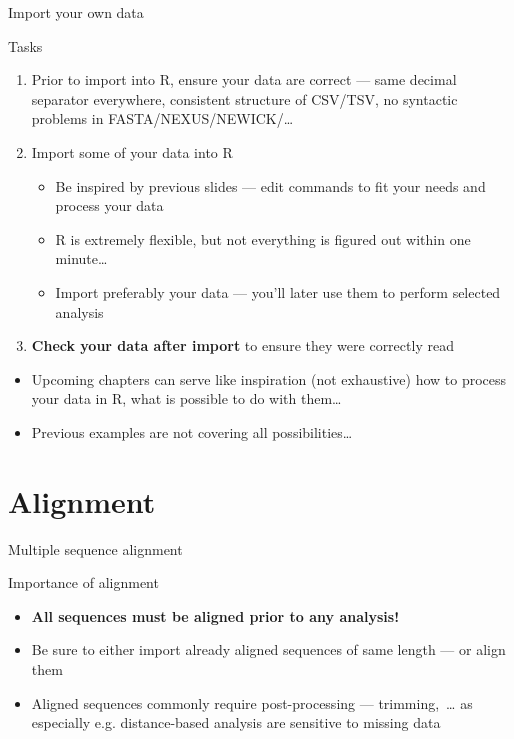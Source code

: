 \documentclass[compress, xelatex, 11pt, xcolor=svgnames, aspectratio=169,
	hyperref={
		bookmarks=true,
		unicode=true,
		colorlinks=true,
		pdftitle={Molecular data in R},
		plainpages=false,
		pdfauthor={Vojtech Zeisek},
		pdfsubject={Course about phylogeny and evolution in R},
		pdfcreator={XeLaTeX},
		pdfkeywords={R, evolution, phylogeny, molecular data},
		linkcolor=Crimson, %
		anchorcolor=Magenta, %
		citecolor=Magenta, %
		filecolor=Magenta, %
		menucolor=Magenta, %
		urlcolor=DodgerBlue, %
		},
	url={hyphens, lowtilde} %
	]{beamer}
\begin{document}
\begin{frame}{Import your own data}
	\begin{exampleblock}{Tasks}
		\begin{enumerate}
			\item Prior to import into R, \alert{ensure your data are correct} --- same decimal separator everywhere, consistent structure of CSV/TSV, no syntactic problems in FASTA/NEXUS/NEWICK/\ldots
			\item Import some of your data into R
			\begin{itemize}
				\item Be inspired by previous slides --- edit commands to fit your needs and process your data
				\item R is extremely flexible, but not everything is figured out within one minute\ldots
				\item Import preferably your data --- you'll later use them to perform selected analysis
			\end{itemize}
			\item \textbf{Check your data after import} to ensure they were correctly read
		\end{enumerate}
	\end{exampleblock}
	\begin{itemize}
		\item Upcoming chapters can serve like inspiration (not exhaustive) how to process your data in R, what is possible to do with them\ldots
		\item Previous examples are not covering all possibilities\ldots
	\end{itemize}
\end{frame}

\section{Alignment}

\begin{frame}[fragile]{Multiple sequence alignment}
	\tableofcontents[currentsection, sectionstyle=show/hide, hideothersubsections]
	\begin{alertblock}{Importance of alignment}
		\begin{itemize}
			\item \textbf{All sequences must be aligned prior to any analysis!}
			\item Be sure to either import already aligned sequences of same length --- or align them
			\item Aligned sequences commonly require post-processing --- trimming,~\ldots{ }as especially e.g. distance-based analysis are sensitive to missing data
		\end{itemize}
	\end{alertblock}
\end{frame}
\end{document}
